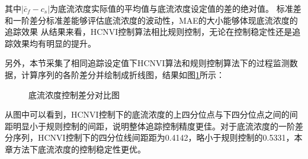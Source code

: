 其中$|\bar{c}_{f}-{c}_{s}|$为底流浓度实际值的平均值与底流浓度设定值的差的绝对值。
标准差和一阶差分标准差能够评估底流浓度的波动性，MAE的大小能够体现底流浓度的追踪效果
从结果来看，HCNVI控制算法相比规则控制，无论在控制稳定性还是追踪效果均有明显的提升。

另外，本节采集了相同追踪设定值下HCNVI算法和规则控制算法下的过程监测数据，计算序列的各阶差分并绘制成折线图，结果如图\ref{fig:difference}所示：
\begin{figure}[htb]
  \centering
  \caption{底流浓度控制差分对比图}
  \label{fig:difference}
\end{figure}
从图中可以看到，HCNVI控制下的底流浓度的上四分位点与下四分位点之间的间距明显小于规则控制的间距，说明整体追踪控制精度更佳。对于底流浓度的一阶差分序列，HCNVI控制下的四分位线间距距为0.4142，略小于规则控制的0.5331，本章方法下底流浓度的控制稳定性更优。

